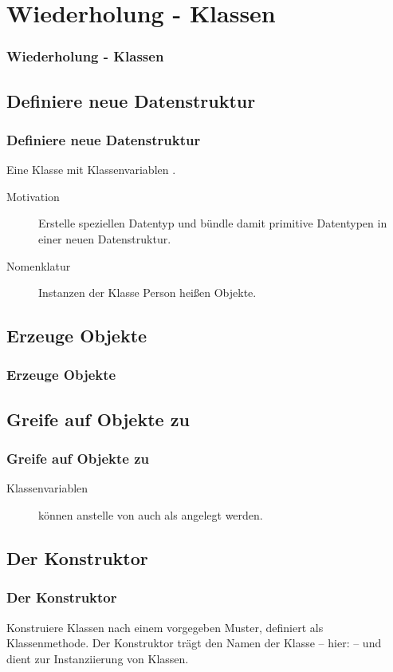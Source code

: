 \def\stitle{Wiederholung - Klassen}
\section{\stitle}
\begin{frame}%
  \frametitle{\stitle}%
\tableofcontents[current]
\end{frame}


\def\sstitle{Definiere neue Datenstruktur}
\subsection{\sstitle}
\begin{frame}%
  \frametitle{\sstitle}%
Eine Klasse  mit Klassenvariablen .

\begin{description}
\item[Motivation]
Erstelle speziellen Datentyp  und b\"undle damit primitive Datentypen  in einer neuen Datenstruktur.
\item[Nomenklatur] Instanzen der Klasse Person hei\ss en Objekte.
\end{description}
\end{frame}


\def\sstitle{Erzeuge Objekte}
\subsection{\sstitle}
\begin{frame}%
  \frametitle{\sstitle}%

\end{frame}


\def\sstitle{Greife auf Objekte zu}
\subsection{\sstitle}
\begin{frame}%
  \frametitle{\sstitle}%

\begin{description}
\item[Klassenvariablen] k\"onnen anstelle von  auch als  angelegt werden.
\end{description}
\end{frame}


\def\sstitle{Der Konstruktor}
\subsection{\sstitle}
\begin{frame}%
  \frametitle{\sstitle}%
Konstruiere Klassen nach einem vorgegeben Muster, definiert als Klassenmethode.
Der Konstruktor tr\"agt den Namen der Klasse -- hier:  -- und dient zur Instanziierung von Klassen.

\end{frame}


